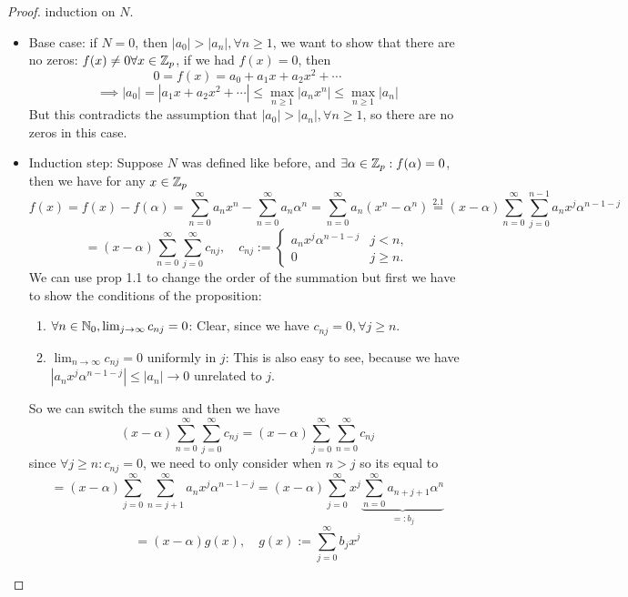 \documentclass[a4paper]{article}
\theoremstyle{plain}
\theoremstyle{definition}
\begin{document}
\begin{proof}
  induction on $N$.
  \begin{itemize}
    \item Base case: if $N = 0$, then $|a_{0}| > |a_{n}|, \forall n \geq 1$, we want to show that there are no zeros: $f(x) \neq 0 \forall x \in \Bbb Z_{p}$, if we had $f(x) = 0$, then
          $$0 = f(x) = a_{0} + a_{1}x + a_{2}x^{2} + \cdots$$
          $$ \implies |a_{0}| = |a_{1}x + a_{2}x^{2} + \cdots| \leq \max_{n \geq 1}|a_{n}x^{n}| \leq \max_{n \geq 1}|a_{n}|$$
          But this contradicts the assumption that $|a_{0}| > |a_{n}|, \forall n \geq 1$, so there are no zeros in this case.
    \item Induction step:
          Suppose $N$ was defined like before, and $\exists \alpha \in \Bbb Z_{p} : f(\alpha) = 0$, then we have for any $x \in \Bbb Z_{p}$
          $$f(x) = f(x) - f(\alpha) = \sum_{n=0}^{\infty}a_{n}x^{n} - \sum_{n=0}^{\infty}a_{n}\alpha^{n} = \sum_{n=0}^{\infty}a_{n}(x^{n} - \alpha^{n}) \overset{2.1}= (x-\alpha)\sum_{n=0}^{\infty}\sum_{j = 0}^{n-1} a_{n}x^{j}\alpha^{n-1-j}$$
          $$ = (x-\alpha) \sum_{n=0}^{\infty} \sum_{j=0}^{\infty} c_{nj}, \quad c_{nj}:= \begin{cases}a_{n}x^{j}\alpha^{n-1-j} & j < n, \\ 0 & j \geq n.\end{cases}$$
          We can use prop 1.1 to change the order of the summation but first we have to show the conditions of the proposition:
          \begin{enumerate}
            \item $\forall n \in \Bbb N_{0}, \lim_{j \to \infty} c_{nj} = 0$:
                  Clear, since we have $c_{nj} = 0, \forall j \geq n$.
            \item $\lim_{n \to \infty}c_{nj} = 0$ uniformly in $j$:
                  This is also easy to see, because we have $|a_{n}x^{j}\alpha^{n-1-j}| \leq |a_{n}| \to 0$ unrelated to $j$.
          \end{enumerate}
          So we can switch the sums and then we have
          $$(x-\alpha) \sum_{n=0}^{\infty} \sum_{j=0}^{\infty} c_{nj} = (x-\alpha) \sum_{j=0}^{\infty} \sum_{n=0}^{\infty} c_{nj}$$
          since $\forall j \geq n:c_{nj} = 0$, we need to only consider when $n > j$ so its equal to
          $$= (x-\alpha) \sum_{j=0}^{\infty} \sum_{n=j+1}^{\infty} a_{n}x^{j}\alpha^{n-1-j} = (x-\alpha) \sum_{j=0}^{\infty} x^{j} \underbrace{\sum_{n=0}^{\infty} a_{n+j+1}\alpha^{n}}_{=:b_{j}}$$
          $$= (x-\alpha)g(x),\quad g(x):=\sum_{j=0}^{\infty}b_{j}x^{j}$$

\end{itemize}
\end{proof}
\end{document}
